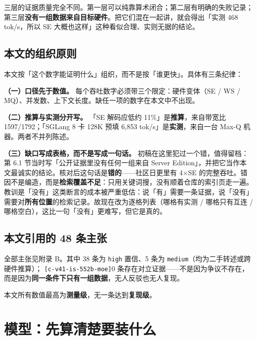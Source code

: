 三层的证据质量完全不同。第一层可以纯靠算术闭合；第二层有明确的失败记录；第三层\textbf{没有一组数据来自目标硬件}。把它们混在一起讲，就会得出「实测 468 tok/s，所以 SE 大概也这样」这种看似合理、实则无据的结论。


\subsection{本文的组织原则}

本文按「这个数字能证明什么」组织，而不是按「谁更快」。具体有三条纪律：


\textbf{（一）口径先于数值。} 每个吞吐数字必须带三个限定：硬件变体（SE / WS / MQ）、并发数、上下文长度。缺任一项的数字在本文中不出现。


\textbf{（二）推算与实测分开写。} 「SE 解码应低约 11\%」是\textbf{推算}，来自带宽比 1597/1792；「SGLang 8 卡 128K 预填 6,853 tok/s」是\textbf{实测}，来自一台 Max-Q 机器。两者不并列陈述。


\textbf{（三）缺口写成表格，而不是写成一句话。} 初稿在这里犯过一个错，值得留档：第 6.1 节当时写「公开证据里没有任何一组来自 Server Edition」，并把它当作本文最诚实的结论。核对后这句话是\textbf{错的}——社区日更里有 4×SE 的完整吞吐。错因不是编造，而是\textbf{检索覆盖不足}：只用关键词搜，没有顺着仓库的索引页走一遍。教训是「没有」这类断言的成本被严重低估：说「有」需要一条证据，说「没有」需要对\textbf{所有位置}的检索记录。故现在改为逐格列表（哪格有实测 / 哪格只有互连 / 哪格空白），这比一句「没有」更难写，但它是真的。


\subsection{本文引用的 48 条主张}

全部主张见附录 B。其中 38 条为 \texttt{high} 置信、5 条为 \texttt{medium}（均为二手转述或跨硬件推算）； {\scriptsize\texttt{[c-\hspace{0pt}v41-\hspace{0pt}is-\hspace{0pt}552b-\hspace{0pt}moe]}}0 条存在对立证据——不是因为争议不存在，而是因为\textbf{同一条件下只有一组数据}，无人反驳也无人复现。


本文所有数值最高为\textbf{测量级}，无一条达到\textbf{复现级}。



\section{模型：先算清楚要装什么}

